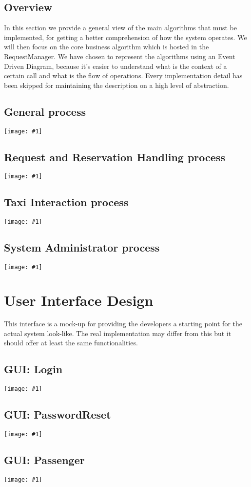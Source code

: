\documentclass[11pt, a4paper,titlepage]{article}
\newcommand{\image}[1]{
	\begin{center}
		\noindent \texttt{[image: \#1]}
	\end{center}
	}
\begin{document}
	\subsection{Overview}
	In this section we provide a general view of the main algorithms that must be implemented, for getting a better comprehension of how the system operates.
	We will then focus on the core business algorithm which is hosted in the RequestManager.
	We have chosen to represent the algorithms using an Event Driven Diagram, because it's easier to understand what is the context of a certain call and what is the flow of operations. Every implementation detail has been skipped for maintaining the description on a high level of abstraction.
	\newpage
	\subsection{General process}
	\image{edp_general.png}
	\newpage
	\subsection{Request and Reservation Handling process}
		\image{edp_request.png}
	\newpage
	\subsection{Taxi Interaction process}
		\image{edp_taxi.png}
	\newpage
	\subsection{System Administrator process}
		\image{edp_admin.png}
		\newpage
\section{User Interface Design}
	This interface is a mock-up for providing the developers a starting point for the actual system look-like. The real implementation may differ from this but it should offer at least the same functionalities.
	\subsection{GUI: Login}
		\image{gui_login.png}
	\subsection{GUI: PasswordReset}
		\image{gui_passwordreset.png}
	\subsection{GUI: Passenger}
		\image{gui_passenger.png}
\end{document}
